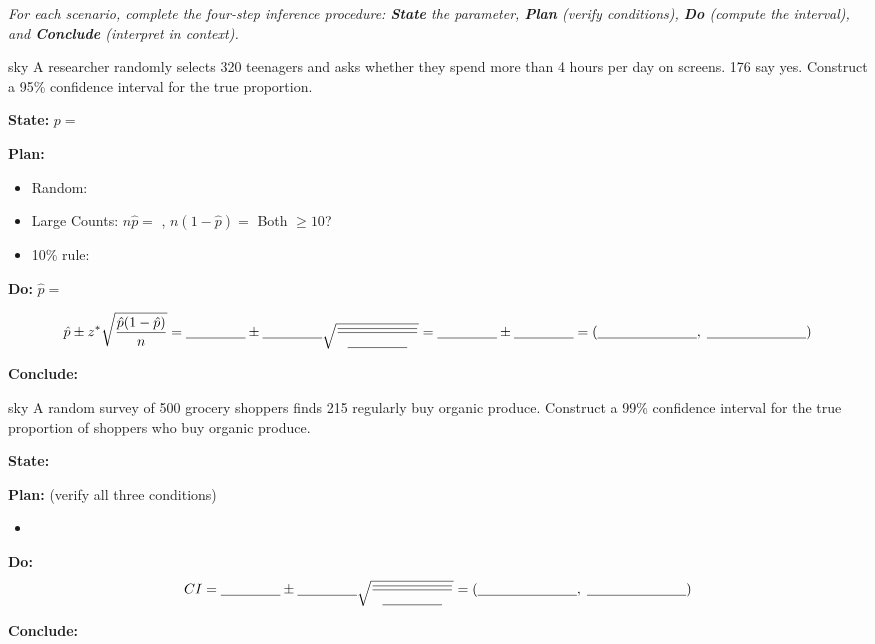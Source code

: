 \documentclass[10pt]{article}
\begin{document}
\namepartnerperiod

\vspace{0.15in}

\textit{For each scenario, complete the four-step inference procedure:
\textbf{State} the parameter, \textbf{Plan} (verify conditions), \textbf{Do} (compute the interval),
and \textbf{Conclude} (interpret in context).}

\begin{scenariobox}{sky}
A researcher randomly selects 320 teenagers and asks whether they spend more than 4 hours
per day on screens. 176 say yes. Construct a 95\% confidence interval for the true proportion.

\textbf{State:} $p = $ 

\textbf{Plan:}
\begin{itemize}
  \item Random: \blank{7cm}
  \item Large Counts: $n\hat p = $ \blank{2.5cm}, $n(1-\hat p) = $ \blank{2.5cm} \quad Both $\ge 10$? \blank{1cm}
  \item 10\% rule: \blank{5cm}
\end{itemize}

\textbf{Do:} $\hat p = $ \blank{2cm}

\[
  \hat p \pm z^* \sqrt{\frac{\hat p(1-\hat p)}{n}}
  = \blank{1.5cm} \pm \blank{1.5cm}\sqrt{\frac{\blank{2cm}}{\blank{1.5cm}}}
  = \blank{1.5cm} \pm \blank{1.5cm}
  = (\blank{2.5cm},\; \blank{2.5cm})
\]

\textbf{Conclude:} 
\end{scenariobox}

\begin{scenariobox}{sky}
A random survey of 500 grocery shoppers finds 215 regularly buy organic produce. Construct
a 99\% confidence interval for the true proportion of shoppers who buy organic produce.

\textbf{State:} 

\textbf{Plan:} (verify all three conditions)
\begin{itemize}
  \item[] 
\end{itemize}

\textbf{Do:}
\[
  CI = \blank{1.5cm} \pm \blank{1.5cm}\sqrt{\frac{\blank{2cm}}{\blank{1.5cm}}}
     = (\blank{2.5cm},\; \blank{2.5cm})
\]

\textbf{Conclude:} 
\end{scenariobox}
\end{document}
